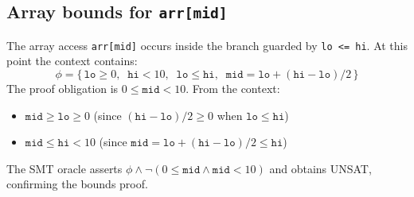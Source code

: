 \subsection{Array bounds for \texttt{arr[mid]}}
%
The array access \texttt{arr[mid]} occurs inside the branch guarded by \texttt{lo <= hi}. At this point the context contains:
\[
  \phi = \{\, \mathtt{lo} \ge 0, \;\; \mathtt{hi} < 10, \;\; \mathtt{lo} \le \mathtt{hi}, \;\; \mathtt{mid} = \mathtt{lo} + (\mathtt{hi} - \mathtt{lo}) / 2 \,\}
\]
The proof obligation is $0 \le \mathtt{mid} < 10$. From the context:
\begin{itemize}
  \item $\mathtt{mid} \ge \mathtt{lo} \ge 0$ (since $(\mathtt{hi} - \mathtt{lo})/2 \ge 0$ when $\mathtt{lo} \le \mathtt{hi}$)
  \item $\mathtt{mid} \le \mathtt{hi} < 10$ (since $\mathtt{mid} = \mathtt{lo} + (\mathtt{hi} - \mathtt{lo})/2 \le \mathtt{hi}$)
\end{itemize}
The SMT oracle asserts $\phi \wedge \lnot(0 \le \mathtt{mid} \wedge \mathtt{mid} < 10)$ and obtains UNSAT, confirming the bounds proof.

